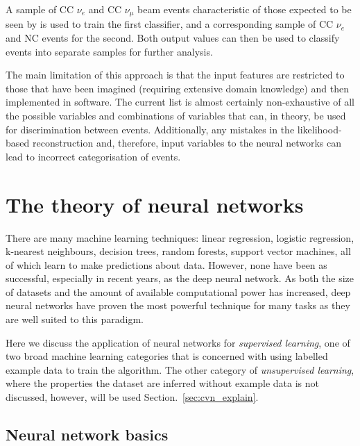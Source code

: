 A sample of CC $\nu_{e}$ and CC $\nu_{\mu}$ beam events characteristic of those expected to be
seen by \chips is used to train the first classifier, and a corresponding sample of CC $\nu_{e}$
and NC events for the second. Both output values can then be used to classify events into separate
samples for further analysis.

The main limitation of this approach is that the input features are restricted to those that have
been imagined (requiring extensive domain knowledge) and then implemented in software. The current
list is almost certainly non-exhaustive of all the possible variables and combinations of
variables that can, in theory, be used for discrimination between events. Additionally, any
mistakes in the likelihood-based reconstruction and, therefore, input variables to the neural
networks can lead to incorrect categorisation of events.

\section{The theory of neural networks} %
\label{sec:cvn_theory} %

There are many machine learning techniques: linear regression, logistic regression, k-nearest
neighbours, decision trees, random forests, support vector machines, all of which learn to make
predictions about data. However, none have been as successful, especially in recent years, as the
deep neural network. As both the size of datasets and the amount of available computational power
has increased, deep neural networks have proven the most powerful technique for many tasks as they
are well suited to this paradigm.

Here we discuss the application of neural networks for \emph{supervised learning}, one of two
broad machine learning categories that is concerned with using labelled example data to train the
algorithm. The other category of \emph{unsupervised learning}, where the properties the dataset
are inferred without example data is not discussed, however, will be used
Section.~\ref{sec:cvn_explain}.

\subsection{Neural network basics} %
\label{sec:cvn_theory_basics} %

